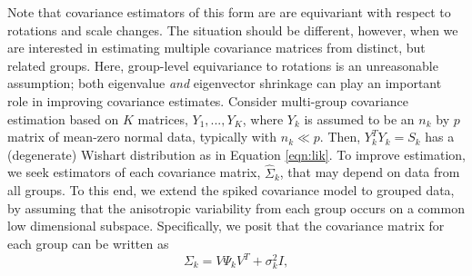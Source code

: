\documentclass[12pt]{article}
\begin{document}
Note that covariance estimators of this form are are equivariant with
respect to rotations and scale changes.  The situation should be
different, however, when we are interested in estimating multiple
covariance matrices from distinct, but related groups.  Here,
group-level equivariance to rotations is an unreasonable assumption;
both eigenvalue \emph{and} eigenvector shrinkage can play an important
role in improving covariance estimates.  Consider multi-group
covariance estimation based on $K$ matrices, $Y_1, ..., Y_K$, where
$Y_k$ is assumed to be an $n_k$ by $p$ matrix of mean-zero normal
data, typically with $n_k \ll p$.  Then, $Y_k^TY_k = S_k$ has a
(degenerate) Wishart distribution as in Equation \ref{eqn:lik}.  To
improve estimation, we seek estimators of each covariance matrix,
$\hat{\Sigma}_k$, that may depend on data from all groups.  To this
end, we extend the spiked covariance model to grouped data, by
assuming that the anisotropic variability from each group occurs on a
common low dimensional subspace.  Specifically, we posit that the
covariance matrix for each group can be written as
\begin{equation}
\Sigma_k = V\Psi_kV^T + \sigma^2_kI,
\label{eqn:sspsi}
\end{equation}



\end{document}

